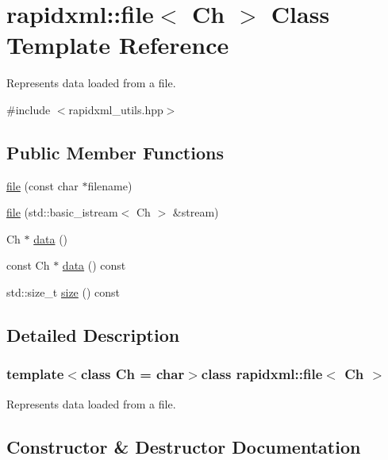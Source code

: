 \hypertarget{classrapidxml_1_1file}{}\section{rapidxml\+:\+:file$<$ Ch $>$ Class Template Reference}
\label{classrapidxml_1_1file}


Represents data loaded from a file.  




{\ttfamily \#include $<$rapidxml\+\_\+utils.\+hpp$>$}

\subsection*{Public Member Functions}
\begin{DoxyCompactItemize}
\item 
\hyperlink{classrapidxml_1_1file_ae881a3cab1fe7152d45c92a8d7606cb3}{file} (const char $\ast$filename)
\item 
\hyperlink{classrapidxml_1_1file_a90707ccd991cc392dcf4bef37eed9d1f}{file} (std\+::basic\+\_\+istream$<$ Ch $>$ \&stream)
\item 
Ch $\ast$ \hyperlink{classrapidxml_1_1file_af1c71d65862c7af14e4708e32a80c1de}{data} ()
\item 
const Ch $\ast$ \hyperlink{classrapidxml_1_1file_aceb8f5ebd577c946a74b1ea3e2e0c576}{data} () const 
\item 
std\+::size\+\_\+t \hyperlink{classrapidxml_1_1file_a20191d167c6e00a88a44ca9a3a54e1c5}{size} () const 
\end{DoxyCompactItemize}


\subsection{Detailed Description}
\subsubsection*{template$<$class Ch = char$>$class rapidxml\+::file$<$ Ch $>$}

Represents data loaded from a file. 

\subsection{Constructor \& Destructor Documentation}
\hypertarget{classrapidxml_1_1file_ae881a3cab1fe7152d45c92a8d7606cb3}{}
